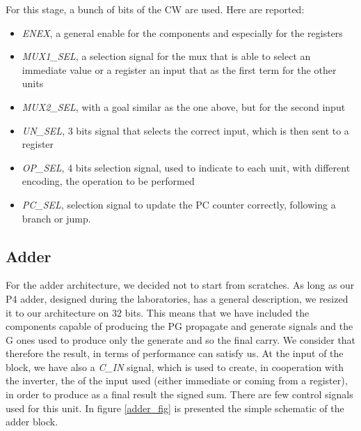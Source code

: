For this stage, a bunch of bits of the \textsf{CW} are used. Here are reported:
\begin{itemize}
	\item \textit{ENEX}, a general enable for the components and especially for the registers
	\item \textit{MUX1\_SEL}, a selection signal for the mux that is able to select an immediate value or a register an input that as the first term for the other units
	\item \textit{MUX2\_SEL}, with a goal similar as the one above, but for the second input
	\item \textit{UN\_SEL}, 3 bits signal that selects the correct input, which is then sent to a register
	\item \textit{OP\_SEL}, 4 bits selection signal, used to indicate to each unit, with different encoding, the operation to be performed
	\item \textit{PC\_SEL}, selection signal to update the PC counter correctly, following a branch or jump.
\end{itemize}


\subsection{Adder}

For the adder architecture, we decided not to start from scratches. As long as our P4 adder, designed during the laboratories, has a general description, we resized it to our architecture on 32 bits. This means that we have included the components capable of producing the \textsf{PG} propagate and generate signals and the \textsc{G} ones used to produce only the generate and so the final carry. We consider that therefore the result, in terms of performance can satisfy us. At the input of the block, we have also a \textit{C\_IN} signal, which is used to create, in cooperation with the inverter, the  of the input used (either immediate or coming from a register), in order to produce as a final result the signed sum. There are few control signals used for this unit. In figure \ref{adder_fig} is presented the simple schematic of the adder block.

